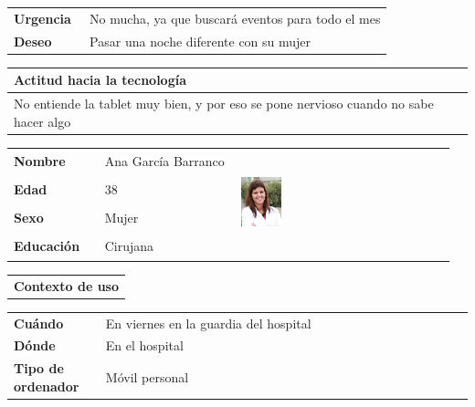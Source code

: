 \documentclass[11pt]{article}
\begin{document}
\begin{table}[H]
  \begin{tabular}{p{0.2\linewidth}|p{0.8\linewidth}}
    \toprule
    \textbf{Urgencia} & No mucha, ya que buscará eventos para todo el mes\\
    \textbf{Deseo}  & Pasar una noche diferente con su mujer \\
    \bottomrule
  \end{tabular}

  \begin{tabular}{p{1.028\linewidth}}
    \textbf{Actitud hacia la tecnología}\\
    \midrule
    No entiende la tablet muy bien, y por eso se pone nervioso cuando no sabe hacer algo
  \end{tabular}
\end{table}


\begin{table}[H]
  \centering
  \begin{tabular}{p{0.2\linewidth}|p{0.3\linewidth}p{0.475\linewidth}}
    \toprule
    \textbf{Nombre} & Ana García Barranco &\multirow{4}{*}{\begin{minipage}{1.\textwidth}\includegraphics[width=0.2\textwidth, height=30mm]{Ana}\end{minipage}}\\
    \textbf{Edad} & 38 & \\
    \textbf{Sexo} & Mujer & \\
    \textbf{Educación} & Cirujana & \\
    \bottomrule
  \end{tabular}

  \begin{tabular}{l}
    \textbf{Contexto de uso} 
  \end{tabular}
  
  \begin{tabular}{p{0.2\linewidth}|p{0.8\linewidth}}
    \toprule
    \textbf{Cuándo} & En viernes en la guardia del hospital\\
    \textbf{Dónde}  & En el hospital\\
    \textbf{Tipo de ordenador} & Móvil personal\\
    \bottomrule
  \end{tabular}


\end{table}
\end{document}
